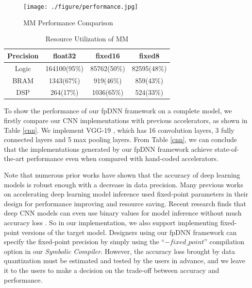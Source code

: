 \documentclass{acm_proc_article-sp-copy}
\begin{document}
\begin{figure}
	\centering
	\texttt{[image: ./figure/performance.jpg]}
	\caption{MM Performance Comparison}
	\label{performance}
\end{figure}

\begin{table}
	\centering
	\begin{tabular}{|c|c|c|c|}
		\hline
		Precision & float32 & fixed16 & fixed8\\
		\hline
		Logic & 164100(95\%) & 85762(50\%) & 82595(48\%)\\
		\hline
		BRAM & 1343(67\%) & 919(46\%) & 859(43\%)\\
		\hline
		DSP & 264(17\%) & 1036(65\%) & 524(33\%)\\
		\hline
	\end{tabular}
	\caption{Resource Utilization of MM}
	\label{resource}
\end{table}

To show the performance of our fpDNN framework on a complete model, we firstly compare our CNN implementations with previous accelerators, as shown in Table \ref{cnn}. We implement VGG-19 \cite{vgg}, which has 16 convolution layers, 3 fully connected layers and 5 max pooling layers. From Table \ref{cnn}, we can conclude that the implementations generated by our fpDNN framework achieve state-of-the-art performance even when compared with hand-coded accelerators.

Note that numerous prior works \cite{eie} \cite{handeep} have shown that the accuracy of deep learning models is robust enough with a decrease in data precision. Many previous works on accelerating deep learning model inference \cite{fpga'16} \cite{aeye} used fixed-point parameters in their design for performance improving and resource saving. Recent research finds that deep CNN models can even use binary values for model inference without much accuracy loss \cite{bnn} \cite{xnor}. So in our implementation, we also support implementing fixed-point versions of the target model. Designers using our fpDNN framework can specify the fixed-point precision by simply using the ``$-fixed\_point$'' compilation option in our \emph{Symbolic Compiler}. However, the accuracy loss brought by data quantization must be estimated and tested by the users in advance, and we leave it to the users to make a decision on the trade-off between accuracy and performance.
\end{document}
